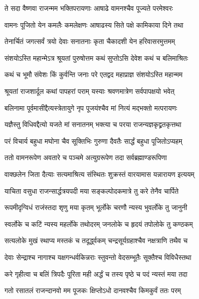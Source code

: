 \twolineshloka
{ते सदा वैष्णवा राजन्मम भक्तिपरायणाः}
{आषाढे वामनश्चैव पूज्यते परमेश्वरः}%

\twolineshloka
{वामनः पूजितो येन कमलैः कमलेक्षणः}
{आषाढस्य सिते पक्षे कामिकाया दिने तथा}%

\twolineshloka
{तेनार्चितं जगत्सर्वं त्रयो देवाः सनातनाः}
{कृता चैकादशी येन हरिवासरमुत्तमम्}%


\twolineshloka
{संशयोऽस्ति महान्मेऽत्र श्रूयतां पुरुषोत्तम}
{कथं सुप्तोऽसि देवेश कथं च बलिमाश्रितः}%

\twolineshloka
{कथं च भूमौ संवेशः किं कुर्वन्ति जनाः परे}
{एतद्वद महाप्राज्ञ संशयोऽस्ति महान्मम}%


\twolineshloka
{श्रूयतां राजशार्दूल कथां पापहरां पराम्}
{यस्याः श्रवणमात्रेण सर्वपापक्षयो भवेत्}%

\twolineshloka
{बलिनामा पूर्वमासीद्दैत्यस्त्रेतायुगे नृप}
{पूजयंश्चैव मां नित्यं मद्भक्तो मत्परायणः}%

\twolineshloka
{यज्ञैस्तु विधिवद्दैत्यो यजते मां सनातनम्}
{भक्त्या च परया राजन्यज्ञकृद्व्रतकृत्तथा}%

\twolineshloka
{परं विचार्य बहुधा मघोना चैव सूक्तिभिः}
{गुरुणा दैवतैः सार्द्धं बहुधा पूजितोऽप्यहम्}%

\twolineshloka
{ततो वामनरूपेण अवतारे च पञ्चमे}
{अत्युग्ररूपेण तदा सर्वब्रह्माण्डरूपिणा}%

\twolineshloka
{वाक्छलेन जिता दैत्याः सत्यमाश्रित्य संस्थितः}
{शुक्रस्तं वारयामास यन्नारायण इत्ययम्}%

\twolineshloka
{याचिता वसुधा राजन्सार्द्धत्रयपदी मया}
{सङ्कल्पोदकमात्रे तु करे तेनैव चार्पिते}%

\twolineshloka
{रूपमीदृग्विधं राजंस्तदा शृणु मया कृतम्}
{भूर्लोके चरणौ न्यस्य भुवर्लोके तु जानुनी}%

\twolineshloka
{स्वर्लोके च कटिं न्यस्य महर्लोके तथोदरम्}
{जनलोके च हृदयं तपोलोके तु कण्ठकम्}%

\twolineshloka
{सत्यलोके मुखं स्थाप्य मस्तकं च तदूर्द्ध्वकम्}
{चन्द्रसूर्यग्रहाश्चैव नक्षत्राणि तथैव च}%

\twolineshloka
{देवाः सेन्द्राश्च नागाश्च यक्षगन्धर्वकिन्नराः}
{स्तुवन्तो वेदसम्भूतैः सूक्तैश्च विविधैस्तथा}%

\twolineshloka
{करे गृहीत्वा च बलिं त्रिपदैः पूरिता मही}
{अर्द्धं च तस्य पृष्ठे च पदं न्यस्तं मया तदा}%

\twolineshloka
{गतो रसातलं राजन्दानवो मम पूजकः}
{क्षिप्तोऽधो दानवश्चैव किमकुर्वं ततः परम्}%

